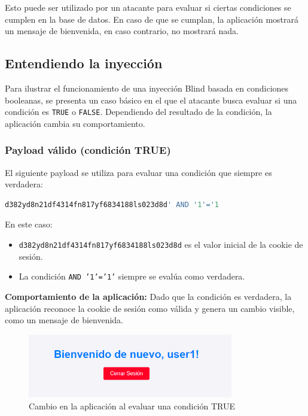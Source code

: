 \documentclass[a4paper,12pt]{article}
\begin{document}
Esto puede ser utilizado por un atacante para evaluar si ciertas condiciones se cumplen en la base de datos. En caso de que se cumplan, la aplicación mostrará un mensaje de bienvenida, en caso contrario, no mostrará nada.

\subsection{Entendiendo la inyección}

Para ilustrar el funcionamiento de una inyección Blind basada en condiciones booleanas, se presenta un caso básico en el que el atacante busca evaluar si una condición es \texttt{TRUE} o \texttt{FALSE}. Dependiendo del resultado de la condición, la aplicación cambia su comportamiento.

\subsubsection{Payload válido (condición TRUE)}

El siguiente payload se utiliza para evaluar una condición que siempre es verdadera:

\begin{lstlisting}[language=SQL]
d382yd8n21df4314fn817yf6834188ls023d8d' AND '1'='1
\end{lstlisting}

En este caso:
\begin{itemize}
    \item \texttt{d382yd8n21df4314fn817yf6834188ls023d8d} es el valor inicial de la cookie de sesión.
    \item La condición \texttt{AND '1'='1'} siempre se evalúa como verdadera.
\end{itemize}

\textbf{Comportamiento de la aplicación:} Dado que la condición es verdadera, la aplicación reconoce la cookie de sesión como válida y genera un cambio visible, como un mensaje de bienvenida.

\begin{figure}[H]
    \centering
    \includegraphics[width=0.8\textwidth]{Imagenes/blind4.png} 
    \caption{Cambio en la aplicación al evaluar una condición TRUE}
\end{figure}
\end{document}
